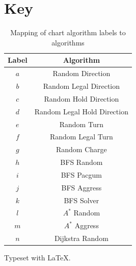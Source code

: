 \documentclass[12pt]{article}
\begin{document}
  \section*{Key}
    \begin{table}[H]
      \centering
      \begin{tabular}{c|c}
          Label & Algorithm\\
          \hline
          $a$ & Random Direction\\
          $b$ & Random Legal Direction\\
          $c$ & Random Hold Direction\\
          $d$ & Random Legal Hold Direction\\
          $e$ & Random Turn\\
          $f$ & Random Legal Turn\\
          $g$ & Random Charge\\
          $h$ & BFS Random\\
          $i$ & BFS Pacgum\\
          $j$ & BFS Aggress\\
          $k$ & BFS Solver\\
          $l$ & $A^*$ Random\\
          $m$ & $A^*$ Aggress\\
          $n$ & Dijkstra Random
      \end{tabular}
      \caption{Mapping of chart algorithm labels to algorithms}
    \end{table}
  \vfill
  Typeset with \LaTeX.
\end{document}
